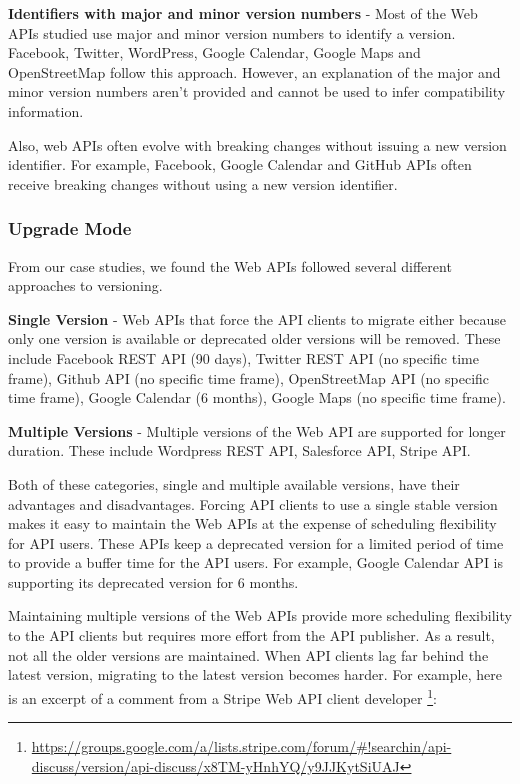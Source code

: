\documentclass[conference]{IEEEtran}
\begin{document}
\textbf{Identifiers with major and minor version numbers} - Most of the Web APIs studied use major and minor version numbers to identify a version. Facebook, Twitter, WordPress, Google Calendar, Google Maps and OpenStreetMap follow this approach. However, an explanation of the major and minor version numbers aren't provided and cannot be used to infer compatibility information.

Also, web APIs often evolve with breaking changes without issuing a new version identifier. For example, Facebook, Google Calendar and GitHub APIs often receive breaking changes without using a new version identifier.


\subsubsection{Upgrade Mode} %

From our case studies, we found the Web APIs followed several different approaches to versioning.

\textbf{Single Version} - Web APIs that force the API clients to migrate either because only one version is available or deprecated older versions will be removed. These include Facebook REST API (90 days), Twitter REST API (no specific time frame), Github API (no specific time frame), OpenStreetMap API (no specific time frame), Google Calendar (6 months), Google Maps (no specific time frame).

\textbf{Multiple Versions} - Multiple versions of the Web API are supported for longer duration. These include Wordpress REST API, Salesforce API, Stripe API.

Both of these categories, single and multiple available versions, have their advantages and disadvantages. Forcing API clients to use a single stable version makes it easy to maintain the Web APIs at the expense of scheduling flexibility for API users. These APIs keep a deprecated version for a limited period of time to provide a buffer time for the API users. For example, Google Calendar API is supporting its deprecated version for 6 months.

Maintaining multiple versions of the Web APIs provide more scheduling flexibility to the API clients but requires more effort from the API publisher. As a result, not all the older versions are maintained. When API clients lag far behind the latest version, migrating to the latest version becomes harder. For example, here is an excerpt of a comment from a Stripe Web API client developer \footnote{\url{https://groups.google.com/a/lists.stripe.com/forum/#!searchin/api-discuss/version/api-discuss/x8TM-yHnhYQ/y9JJKytSiUAJ}}:
\end{document}
